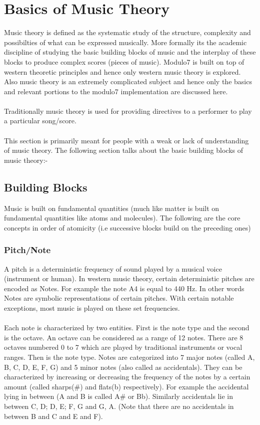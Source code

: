 \chapter{Basics of Music Theory}
\label{sec:music theory}

\noindent Music theory is defined as the systematic study of the structure, complexity and possibilties of what can be expressed musically. More formally its the academic discipline of studying the basic building blocks of music and the interplay of these blocks to produce complex scores (pieces of music). Modulo7 is built on top of western theoretic principles and hence only western music theory is explored. Also music theory is an extremely complicated subject and hence only the basics and relevant portions to the modulo7 implementation are discussed here. \\\\
Traditionally music theory is used for providing directives to a performer to play a particular song/score. \\\\
This section is primarily meant for people with a weak or lack of understanding of music theory. 
The following section talks about the basic building blocks of music theory:-
\section{Building Blocks}

\noindent Music is built on fundamental quantities (much like matter is built on fundamental quantities like atoms and molecules). The following are the core concepts in order of atomicity (i.e successive blocks build on the preceding ones)

\subsection{Pitch/Note}

\noindent A pitch is a deterministic frequency of sound played by a musical voice (instrument or human). In western music theory, certain deterministic pitches are encoded as Notes. For example the note A4 is equal to 440 Hz. In other words Notes are symbolic representations of certain pitches. With certain notable exceptions, most music is played on these set frequencies. \\\\
Each note is characterized by two entities. First is the note type and the second is the octave. An octave can be considered as a range of 12 notes. There are 8 octaves numbered 0 to 7 which are played by traditional instruments or vocal ranges. Then is the note type. Notes are categorized into 7 major notes (called A, B, C, D, E, F, G) and 5 minor notes (also called as accidentals). They can be characterized by increasing or decreasing the frequency of the notes by a certain amount (called sharps(\#) and flats(b) respectively). For example the accidental lying in between (A and B is called A\# or Bb). Similarly accidentals lie in between C, D; D, E; F, G and G, A. (Note that there are no accidentals in between B and C and E and F).


